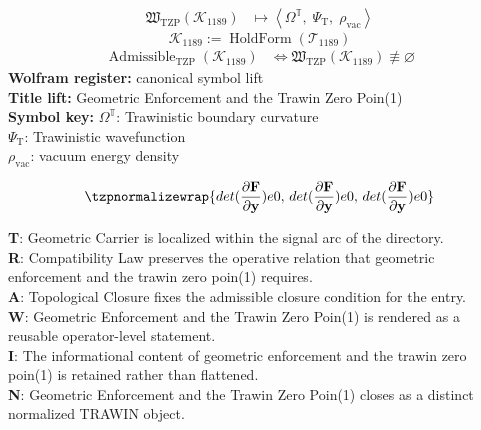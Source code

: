 \noindent
\begin{minipage}[t]{0.48\linewidth}
\begingroup
\small
\[
\begin{aligned}
\mathfrak{W}_{\mathrm{TZP}}\!\left(\mathcal{K}_{1189}\right)
&\longmapsto
\left\langle \Omega^{\mathbb{T}},\; \Psi_{\mathrm{T}},\; \rho_{\mathrm{vac}} \right\rangle
\end{aligned}
\]
\[
\mathcal{K}_{1189}
:=
\operatorname{HoldForm}\!\left(\mathcal{T}_{1189}\right)
\]
\[
\begin{aligned}
\operatorname{Admissible}_{\mathrm{TZP}}\!\left(\mathcal{K}_{1189}\right)
&\Longleftrightarrow
\mathfrak{W}_{\mathrm{TZP}}\!\left(\mathcal{K}_{1189}\right)\not\equiv\varnothing
\end{aligned}
\]
\textbf{Wolfram register:} canonical symbol lift\\
\textbf{Title lift:} Geometric Enforcement and the Trawin Zero Poin(1)\\
\textbf{Symbol key:} \(\Omega^{\mathbb{T}}\): Trawinistic boundary curvature\\ \(\Psi_{\mathrm{T}}\): Trawinistic wavefunction\\ \(\rho_{\mathrm{vac}}\): vacuum energy density
\par
\endgroup
\end{minipage}\hfill
\begin{minipage}[t]{0.48\linewidth}
\[
\tzpnormalizewrap{det(\frac{\partial \mathbf{F}}{\partial \mathbf{y}}) e 0,\,det(\frac{\partial \mathbf{F}}{\partial \mathbf{y}}) e 0,\,det(\frac{\partial \mathbf{F}}{\partial \mathbf{y}}) e 0}
\]

\small
\textbf{T}: Geometric Carrier is localized within the signal arc of the directory.\\
\textbf{R}: Compatibility Law preserves the operative relation that geometric enforcement and the trawin zero poin(1) requires.\\
\textbf{A}: Topological Closure fixes the admissible closure condition for the entry.\\
\textbf{W}: Geometric Enforcement and the Trawin Zero Poin(1) is rendered as a reusable operator-level statement.\\
\textbf{I}: The informational content of geometric enforcement and the trawin zero poin(1) is retained rather than flattened.\\
\textbf{N}: Geometric Enforcement and the Trawin Zero Poin(1) closes as a distinct normalized TRAWIN object.
\normalsize
\end{minipage}

